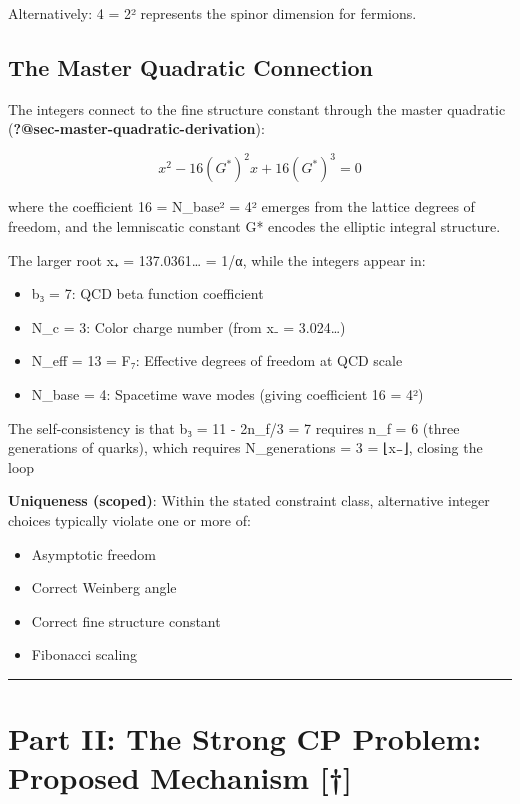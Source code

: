 \documentclass[
  11pt,
  letterpaper,
  twoside,
  openright]{book}
\providecommand{\tightlist}{%
  \setlength{\itemsep}{0pt}\setlength{\parskip}{0pt}}
\begin{document}
Alternatively: 4 = 2² represents the spinor dimension for fermions.

\subsection{The Master Quadratic
Connection}\label{the-master-quadratic-connection}

The integers connect to the fine structure constant through the master
quadratic (\textbf{?@sec-master-quadratic-derivation}):

\[x^2 - 16(G^*)^2 x + 16(G^*)^3 = 0\]

where the coefficient 16 = N\_base² = 4² emerges from the lattice
degrees of freedom, and the lemniscatic constant G* encodes the elliptic
integral structure.

The larger root x₊ = 137.0361\ldots{} = 1/α, while the integers appear
in:

\begin{itemize}
\tightlist
\item
  b₃ = 7: QCD beta function coefficient
\item
  N\_c = 3: Color charge number (from x₋ = 3.024\ldots)
\item
  N\_eff = 13 = F₇: Effective degrees of freedom at QCD scale
\item
  N\_base = 4: Spacetime wave modes (giving coefficient 16 = 4²)
\end{itemize}

The self-consistency is that b₃ = 11 - 2n\_f/3 = 7 requires n\_f = 6
(three generations of quarks), which requires N\_generations = 3 = ⌊x₋⌋,
closing the loop

\textbf{Uniqueness (scoped)}: Within the stated constraint class,
alternative integer choices typically violate one or more of:

\begin{itemize}
\tightlist
\item
  Asymptotic freedom
\item
  Correct Weinberg angle
\item
  Correct fine structure constant
\item
  Fibonacci scaling
\end{itemize}

\begin{center}\rule{0.5\linewidth}{0.5pt}\end{center}

\section{Part II: The Strong CP Problem: Proposed Mechanism
{[}†{]}}\label{part-ii-the-strong-cp-problem-proposed-mechanism}
\end{document}
